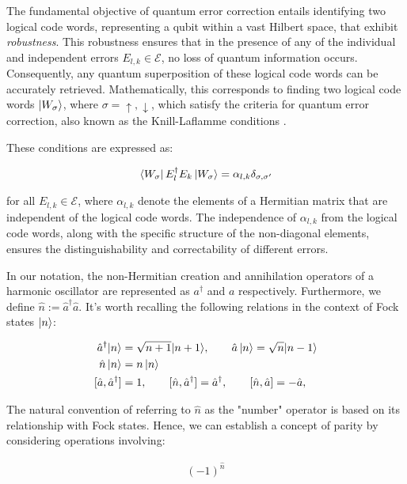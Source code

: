 \documentclass[11pt]{article}
\newcommand\0{\mathbf{0}}
\newcommand\<{\langle}
\renewcommand\>{\rangle}
\begin{document}
The fundamental objective of quantum error correction entails identifying two logical code words, representing a qubit within a vast Hilbert space, that exhibit \textit{robustness}. This robustness ensures that in the presence of any of the individual and independent errors \(E_{l,k} \in \mathcal{E}\), no loss of quantum information occurs. Consequently, any quantum superposition of these logical code words can be accurately retrieved. Mathematically, this corresponds to finding two logical code words \(\ket{W_\sigma}\), where \(\sigma = \uparrow, \downarrow\), which satisfy the criteria for quantum error correction, also known as the Knill-Laflamme conditions \cite{nielsen2002quantum}.

These conditions are expressed as:

\begin{align}
\label{eq:k-l}
\bra{W_\sigma} E_l^\dag E_k \ket{W_\sigma} = \alpha_{l, k} \delta_{\sigma, \sigma'}	
\end{align}

for all \(E_{l,k} \in \mathcal{E}\), where \(\alpha_{l,k}\) denote the elements of a Hermitian matrix that are independent of the logical code words. The independence of \(\alpha_{l,k}\) from the logical code words, along with the specific structure of the non-diagonal elements, ensures the distinguishability and correctability of different errors.

In our notation, the non-Hermitian creation and annihilation operators of a harmonic oscillator are represented as \(a^\dag\) and \(a\) respectively. Furthermore, we define \(\hat{n} := \hat{a}^{\dag }\hat{a}\). It's worth recalling the following relations in the context of Fock states \(\ket{n}\):

\begin{align*}
\hat{a}^{\dagger }|n\rangle &={\sqrt {n+1}}|n+1\rangle, \qquad \hat{a}\ket{n}={\sqrt {n}}|n-1\rangle \\
\hat{n}\ket{n} &= n\ket{n} \\
[\hat{a}, \hat{a}^{\dag }]&=1, \qquad[\hat{n},\hat{a}^{\dag }]=\hat{a}^{\dag }, \qquad[\hat{n}, \hat{a}]=-\hat{a},
\end{align*}

The natural convention of referring to \(\hat{n}\) as the "number" operator is based on its relationship with Fock states. Hence, we can establish a concept of parity by considering operations involving:

\begin{align}
\label{eq:parity}
(-1)^{\hat{n}}	
\end{align}
\end{document}
